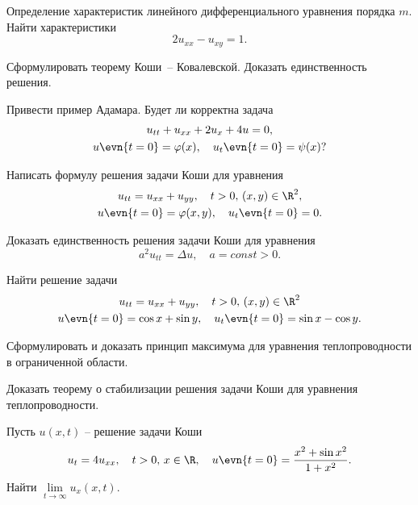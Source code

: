 \documentclass{article}
\begin{document}
\begin{nums}{-2}
\item \begin{nums}{-2}
\item Определение характеристик линейного дифференциального
уравнения порядка $m$. Найти характеристики
$$
2u_{xx} - u_{xy} = 1.
$$
\item Сформулировать теорему Коши~-- Ковалевской. Доказать
единственность решения.
\item Привести пример Адамара. Будет ли корректна задача
\begin{gather*}
u_{tt} + u_{xx} + 2u_x + 4u = 0,\\
u\evn{t = 0} = \varphi(x), \quad u_t\evn{t = 0} = \psi(x)?
\end{gather*}
\end{nums}
\item \begin{nums}{-2}
\item Написать формулу решения задачи Коши для уравнения
\begin{gather*}
u_{tt} = u_{xx} + u_{yy}, \quad t > 0, \,(x, y) \in \R ^2,\\
u\evn{t = 0} = \varphi(x, y), \quad u_t\evn{t = 0} = 0.
\end{gather*}
\item Доказать единственность решения задачи Коши для уравнения
$$
a^2u_{tt} = \Delta u, \quad a = const > 0.
$$
\item Найти решение задачи
\begin{gather*}
u_{tt} = u_{xx} + u_{yy}, \quad t > 0,\, (x, y) \in \R ^2 \\
u\evn{t = 0} = \cos x + \sin y, \quad u_t\evn{t = 0} = \sin x - \cos y.
\end{gather*}
\end{nums}
\item \begin{nums}{-2}
\item Сформулировать и доказать принцип максимума для уравнения
теплопроводности в ограниченной области.
\item Доказать теорему о стабилизации решения задачи Коши для
уравнения теплопроводности.
\item Пусть $u(x, t)$ -- решение задачи Коши
$$
u_t = 4u_{xx}, \quad t > 0, \, x \in \R ,\quad u\evn{t = 0} =
\frac{x^2 + \sin x^2}{1 + x^2}.
$$
Найти $\lim\limits_{t \rightarrow \infty}u_x(x, t).$
\end{nums}
\end{nums}
\end{document}
